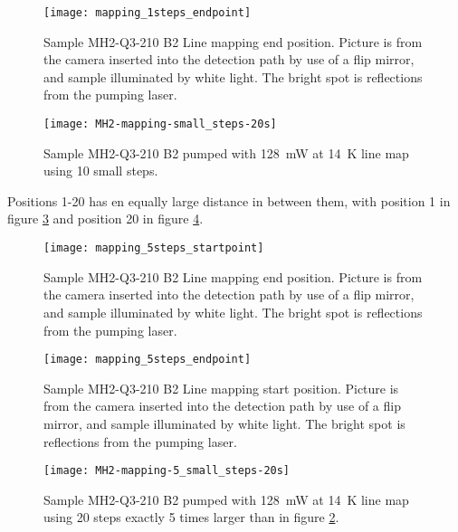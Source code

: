 \begin{figure}[H]
\centering
\texttt{[image: mapping\_1steps\_endpoint]}
\caption[MH2-Q3-210 line mapping end position]{Sample MH2-Q3-210 B2 Line mapping end position. Picture is from the camera inserted into the detection path by use of a flip mirror, and sample illuminated by white light. The bright spot is reflections from the pumping laser.}
\label{fig:mapping_1steps_endpoint}%
\end{figure}

\begin{figure}[H]
\centering
\texttt{[image: MH2-mapping-small\_steps-20s]}
\caption[MH2-Q3-210 line mapping]{Sample MH2-Q3-210 B2 pumped with 128~mW at 14~K line map using 10 small steps.}
\label{fig:MH2-mapping-small_steps-20s}%
\end{figure}



Positions 1-20 has en equally large distance in between them, with position 1 in figure \ref{fig:mapping_5steps_startpoint} and position 20 in figure \ref{fig:mapping_5steps_endpoint}.

\begin{figure}[H]
\centering
\texttt{[image: mapping\_5steps\_startpoint]}
\caption[MH2-Q3-210 line mapping start position]{Sample MH2-Q3-210 B2 Line mapping end position. Picture is from the camera inserted into the detection path by use of a flip mirror, and sample illuminated by white light. The bright spot is reflections from the pumping laser.}
\label{fig:mapping_5steps_startpoint}%
\end{figure}


\begin{figure}[H]
\centering
\texttt{[image: mapping\_5steps\_endpoint]}
\caption[MH2-Q3-210 line mapping start position]{Sample MH2-Q3-210 B2 Line mapping start position. Picture is from the camera inserted into the detection path by use of a flip mirror, and sample illuminated by white light. The bright spot is reflections from the pumping laser.}
\label{fig:mapping_5steps_endpoint}%
\end{figure}

\begin{figure}[H]
\centering
\texttt{[image: MH2-mapping-5\_small\_steps-20s]}
\caption[MH2-Q3-210 line mapping]{Sample MH2-Q3-210 B2 pumped with 128~mW at 14~K line map using 20 steps exactly 5 times larger than in figure \ref{fig:MH2-mapping-small_steps-20s}.}
\label{fig:MH2-mapping-5_small_steps-20s}%
\end{figure}


